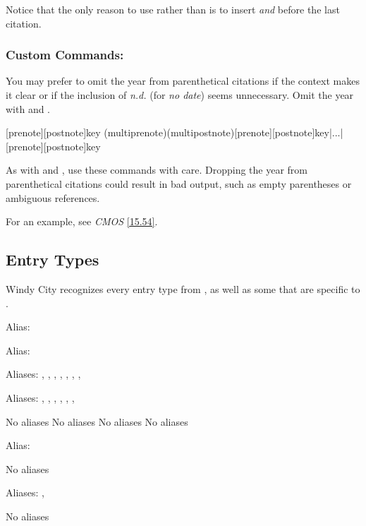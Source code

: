 \documentclass[11pt,letterpaper,oneside]{article}
\begin{document}
Notice that the only reason to use  rather than
 is to insert \textit{and} before the last citation.

\subsubsection{Custom Commands: \emph{}}
\label{parenauth}

You may prefer to omit the year from parenthetical citations if the
context makes it clear or if the inclusion of \textit{n.d.} (for
\textit{no date}) seems unnecessary. Omit the year with
 and .

\begin{ltxsyntax}
[prenote][postnote]{key}
(multiprenote)(multipostnote)[prenote][postnote]{key}|...|[prenote][postnote]{key}
\end{ltxsyntax}

As with  and , use these commands
with care. Dropping the year from parenthetical citations could result
in bad output, such as empty parentheses or ambiguous references.

For an example, see \textit{CMOS} \ref{15.54}.

\subsection{Entry Types}
\label{entrytypes}

Windy City recognizes every entry type from \BibTeX, as well as some
that are specific to \biblatex.

\begin{typelist}
\RaggedRight


Alias: 


Alias: 


Aliases: , , ,
, , ,
, 


Aliases: , ,
, , ,
, 

 No aliases
 No aliases
 No aliases
 No aliases


Alias: 

 No aliases


Aliases: , 

 No aliases

\end{typelist}
\end{document}
